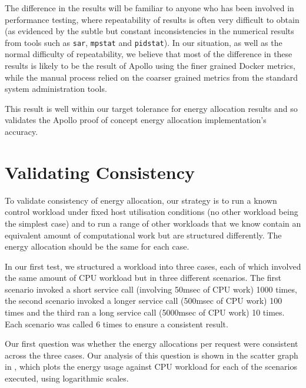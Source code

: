 The difference in the results will be familiar to anyone who has been involved in performance testing, where repeatability of results is often very difficult to obtain (as evidenced by the subtle but constant inconsistencies in the numerical results from tools such as \texttt{sar}, \texttt{mpstat} and \texttt{pidstat}).  In our situation, as well as the normal difficulty of repeatability, we believe that most of the difference in these results is likely to be the result of Apollo using the finer grained Docker metrics, while the manual process relied on the coarser grained metrics from the standard system administration tools. 

This result is well within our target tolerance for energy allocation results and so validates the Apollo proof of concept energy allocation implementation's accuracy.

\section{Validating Consistency}
\label{section:validatingconsistency}

To validate consistency of energy allocation, our strategy is to run a known control workload under fixed host utilisation conditions (no other workload being the simplest case) and to run a range of other workloads that we know contain an equivalent amount of computational work but are structured differently.  The energy allocation should be the same for each case.

In our first test, we structured a workload into three cases, each of which involved the same amount of CPU workload but in three different scenarios.  The first scenario invoked a short service call (involving 50msec of CPU work) 1000 times, the second scenario invoked a longer service call (500msec of CPU work) 100 times and the third ran a long service call (5000msec of CPU work) 10 times.  Each scenario was called 6 times to ensure a consistent result.

Our first question was whether the energy allocations per request were consistent across the three cases.  Our analysis of this question is shown in the scatter graph in , which plots the energy usage against CPU workload for each of the scenarios executed, using logarithmic scales.


